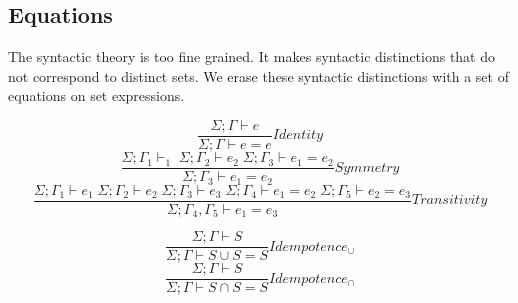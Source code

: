 \subsection{Equations}\label{equations}

The syntactic theory is too fine grained. It makes syntactic
distinctions that do not correspond to distinct sets. We erase these
syntactic distinctions with a set of equations on set expressions.

\[\frac{ \Sigma; \Gamma \vdash e }{ \Sigma; \Gamma  \vdash e = e}Identity\]
\[\frac{\Sigma; \Gamma_{1} \vdash _{1}\; \Sigma; \Gamma_{2} \vdash e_{2}\; \Sigma; \Gamma_{3}  \vdash e_{1} = e_{2}}{ \Sigma; \Gamma_{3}  \vdash e_{1} = e_{2}}Symmetry\]
\[\frac{\Sigma; \Gamma_{1}  \vdash e_{1}\; \Sigma; \Gamma_{2}  \vdash e_{2}\; \Sigma; \Gamma_{3} \vdash e_{3}\; \Sigma; \Gamma_{4}  \vdash e_{1} = e_{2} \; \Sigma; \Gamma_{5}  \vdash e_{2} = e_{3}}{ \Sigma; \Gamma_{4},\Gamma_{5}  \vdash e_{1} = e_{3}}Transitivity\]

\[\frac{\Sigma; \Gamma  \vdash S}{\Sigma; \Gamma \vdash S \cup S =  S}Idempotence_{\cup}\]
\[\frac{\Sigma; \Gamma  \vdash S}{\Sigma; \Gamma \vdash S \cap S =  S}Idempotence_{\cap}\]


